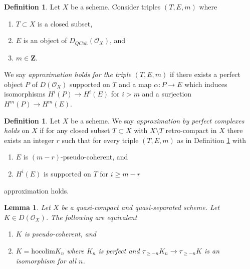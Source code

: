 \documentclass{amsart}
\theoremstyle{plain}
\newtheorem{lemma}[subsection]{Lemma}
\theoremstyle{definition}
\newtheorem{definition}[subsection]{Definition}
\theoremstyle{remark}
\numberwithin{equation}{subsection}
\def\QCoh{\mathit{QCoh}}
\begin{document}
\begin{definition}
\label{definition-approximation-holds}
Let $X$ be a scheme. Consider triples $(T, E, m)$ where
\begin{enumerate}
\item $T \subset X$ is a closed subset,
\item $E$ is an object of $D_\QCoh(\mathcal{O}_X)$, and
\item $m \in \mathbf{Z}$.
\end{enumerate}
We say {\it approximation holds for the triple} $(T, E, m)$ if
there exists a perfect object $P$ of $D(\mathcal{O}_X)$ supported on $T$
and a map $\alpha : P \to E$ which induces isomorphisms $H^i(P) \to H^i(E)$
for $i > m$ and a surjection $H^m(P) \to H^m(E)$.
\end{definition}

\begin{definition}
\label{definition-approximation}
Let $X$ be a scheme. We say {\it approximation by perfect complexes holds}
on $X$ if for any closed subset $T \subset X$ with $X \setminus T$
retro-compact in $X$ there exists an integer $r$ such that
for every triple $(T, E, m)$ as in
Definition \ref{definition-approximation-holds} with
\begin{enumerate}
\item $E$ is $(m - r)$-pseudo-coherent, and
\item $H^i(E)$ is supported on $T$ for $i \geq m - r$
\end{enumerate}
approximation holds.
\end{definition}

\begin{lemma}
\label{lemma-pseudo-coherent-hocolim}
Let $X$ be a quasi-compact and quasi-separated scheme.
Let $K \in D(\mathcal{O}_X)$. The following are equivalent
\begin{enumerate}
\item $K$ is pseudo-coherent, and
\item $K = \text{hocolim} K_n$ where
$K_n$ is perfect and $\tau_{\geq -n}K_n \to \tau_{\geq -n}K$
is an isomorphism for all $n$.
\end{enumerate}
\end{lemma}
\end{document}

